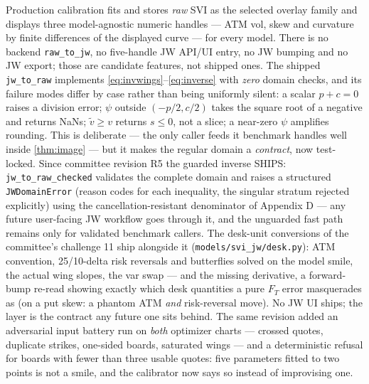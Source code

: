 \documentclass[11pt]{article}
\newcommand{\vmin}{\widetilde v}    %
\begin{document}
\begin{caution}[title={Caution --- product status, and the unguarded converter}]
Production calibration fits and stores \emph{raw} SVI as the selected overlay
family and displays three model-agnostic numeric handles --- ATM vol, skew and
curvature by finite differences of the displayed curve --- for every model.
There is no backend \texttt{raw\_to\_jw}, no five-handle JW API/UI entry, no JW
bumping and no JW export; those are candidate features, not shipped ones.  The
shipped \texttt{jw\_to\_raw} implements \eqref{eq:invwings}--\eqref{eq:inverse}
with \emph{zero} domain checks, and its failure modes differ by case rather than
being uniformly silent: a scalar $p+c=0$ raises a division error; $\psi$ outside
$(-p/2,c/2)$ takes the square root of a negative and returns NaNs; $\vmin\ge v$
returns $s\le0$, not a slice; a near-zero $\psi$ amplifies rounding.  This is
deliberate --- the only caller feeds it benchmark handles well inside
\cref{thm:image} --- but it makes the regular domain a \emph{contract}, now
test-locked.  Since committee revision R5 the guarded inverse SHIPS:
\texttt{jw\_to\_raw\_checked} validates the complete domain and raises a
structured \texttt{JWDomainError} (reason codes for each inequality, the
singular stratum rejected explicitly) using the cancellation-resistant
denominator of Appendix D --- any future user-facing JW workflow goes
through it, and the unguarded fast path remains only for validated
benchmark callers.  The desk-unit conversions of the committee's challenge
11 ship alongside it (\texttt{models/svi\_jw/desk.py}): ATM convention,
25/10-delta risk reversals and butterflies solved on the model smile, the
actual wing slopes, the var swap --- and the missing derivative, a
forward-bump re-read showing exactly which desk quantities a pure $F_T$
error masquerades as (on a put skew: a phantom ATM \emph{and} risk-reversal
move).  No JW UI ships; the layer is the contract any future one sits
behind.  The same revision added an adversarial input battery run on
\emph{both} optimizer charts --- crossed quotes, duplicate strikes,
one-sided boards, saturated wings --- and a deterministic refusal for
boards with fewer than three usable quotes: five parameters fitted to two
points is not a smile, and the calibrator now says so instead of
improvising one.
\end{caution}
\end{document}
